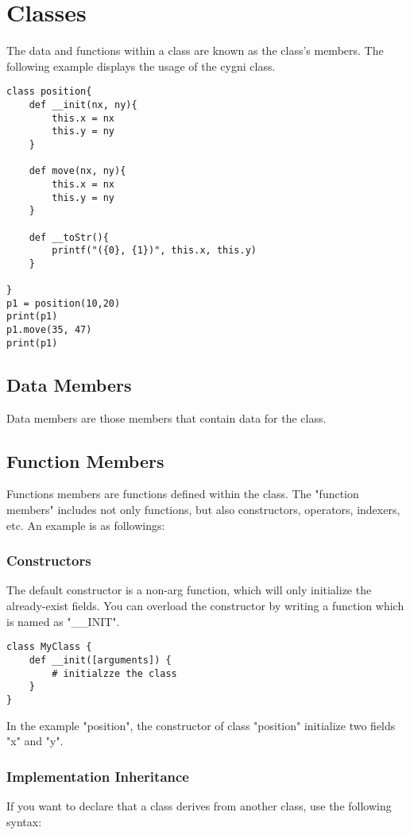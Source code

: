 \chapter{Classes}
The data and functions within a class are known as the class's members.
The following example displays the usage of the cygni class.

\begin{lstlisting}
class position{
	def __init(nx, ny){
		this.x = nx
		this.y = ny
	}

	def move(nx, ny){
		this.x = nx
		this.y = ny
	}

	def __toStr(){
		printf("({0}, {1})", this.x, this.y)
	}

}
p1 = position(10,20)
print(p1)
p1.move(35, 47)
print(p1)
\end{lstlisting}

\section{Data Members}
Data members are those members that contain data for the class.


\section{Function Members}
Functions members are functions defined within the class. The "function members" includes not only functions, but also constructors, operators, indexers, etc. An example is as followings:

\subsection{Constructors}
The default constructor is a non-arg function, which will only initialize the already-exist fields. You can overload the constructor by writing a function which is named as "\_\_INIT".

\begin{lstlisting}
class MyClass {
	def __init([arguments]) {
		# initialzze the class
	}
}
\end{lstlisting}

In the example "position", the constructor of class "position" initialize two fields "x" and "y".

\subsection{Implementation Inheritance}
If you want to declare that a class derives from another class, use the following syntax:

